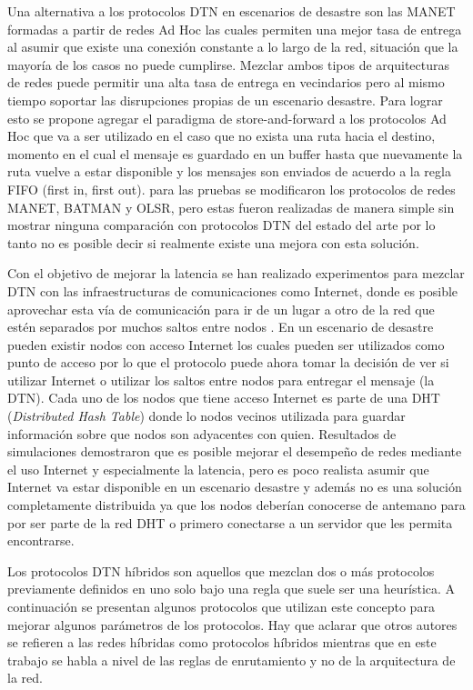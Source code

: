 Una alternativa a los protocolos DTN en escenarios de desastre son las MANET
formadas a partir de redes Ad Hoc las cuales permiten una mejor tasa de entrega
al asumir que existe una conexión constante a lo largo de la red, situación que
la mayoría de los casos no puede cumplirse. Mezclar ambos tipos de arquitecturas
de redes puede permitir una alta tasa de entrega en vecindarios pero al mismo
tiempo soportar las disrupciones propias de un escenario desastre. Para lograr
esto se propone \cite{Raffelsberger2013} agregar el paradigma de
store-and-forward a los protocolos Ad Hoc que va a ser utilizado en el caso que
no exista una ruta hacia el destino, momento en el cual el mensaje es guardado
en un buffer hasta que nuevamente la ruta vuelve a estar disponible y los
mensajes son enviados de acuerdo a la regla FIFO (first in, first out). para las
pruebas se modificaron los protocolos de redes MANET, BATMAN y OLSR, pero estas
fueron realizadas de manera simple sin mostrar ninguna comparación con
protocolos DTN del estado del arte por lo tanto no es posible decir si realmente
existe una mejora con esta solución.

Con el objetivo de mejorar la latencia se han realizado experimentos para
mezclar DTN con las infraestructuras de comunicaciones como Internet, donde es
posible aprovechar esta vía de comunicación para ir de un lugar a otro de la red
que estén separados por muchos saltos entre nodos \cite{mayer_routing_2014}. En
un escenario de desastre pueden existir nodos con acceso Internet los cuales
pueden ser utilizados como punto de acceso por lo que el protocolo puede ahora
tomar la decisión de ver si utilizar Internet o utilizar los saltos entre nodos
para entregar el mensaje (la DTN). Cada uno de los nodos que tiene acceso
Internet es parte de una DHT (\textit{Distributed Hash Table}) donde lo nodos
vecinos utilizada para guardar información sobre que nodos son adyacentes con
quien. Resultados de simulaciones demostraron que es posible mejorar el
desempeño de redes mediante el uso Internet y especialmente la latencia, pero es
poco realista asumir que Internet va estar disponible en un escenario desastre y
además no es una solución completamente distribuida ya que los nodos deberían
conocerse de antemano para por ser parte de la red DHT o primero conectarse a un
servidor que les permita encontrarse.





Los protocolos DTN híbridos son aquellos que mezclan dos o más protocolos
previamente definidos en uno solo bajo una regla que suele ser una
heurística. A continuación se presentan algunos protocolos que utilizan este
concepto para mejorar algunos parámetros de los protocolos. Hay que aclarar que
otros autores se refieren a las redes híbridas como protocolos híbridos mientras
que en este trabajo se habla a nivel de las reglas de enrutamiento y no de la
arquitectura de la red.


